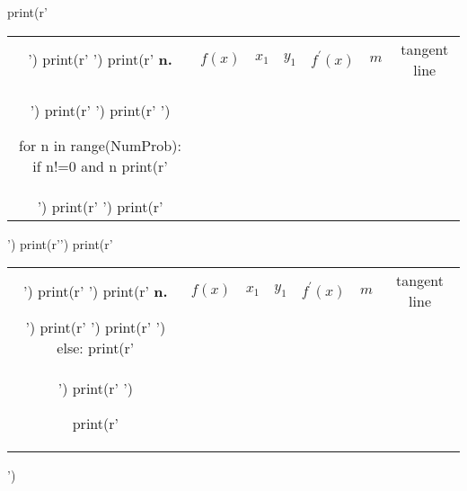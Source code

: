 \documentclass[ebook,12pt,oneside,openany]{memoir} %
\begin{document}
\begin{sympycode}


print(r' \begin{tabular}{|C{\OutColWidthSml}|C{\OutColWidthMed}|C{\OutColWidthSml}|C{\OutColWidthSml}|C{\OutColWidthMed}|C{\OutColWidthSml}|C{\OutColWidthBig}|} ')
print(r' \hline ')
print(r'    \textbf{n.}    &     $f(x)$      &    $x_1$       &     $y_1$       &     $f^{\prime}(x)$     &     $m$     &   \vphantom{\resizebox{!}{\ColHeight}{$|$}}   tangent line \vphantom{\resizebox{!}{\ColHeight}{$|$}}   \\ ')
print(r' \hline ')
print(r' \hline ')

for n in range(NumProb):
	if n!=0 and n %
		print(r' &  &  &  &  &  & \vphantom{\resizebox{!}{\ColHeight}{$|$}}  \vphantom{\resizebox{!}{\ColHeight}{$|$}} \\ ')
		print(r' \hline ')
		print(r'\end{tabular} ')
		print(r'\newpage ')
		print(r' \begin{tabular}{|C{\OutColWidthSml}|C{\OutColWidthMed}|C{\OutColWidthSml}|C{\OutColWidthSml}|C{\OutColWidthMed}|C{\OutColWidthSml}|C{\OutColWidthBig}|} ')
		print(r' \hline ')
		print(r'    \textbf{n.}    &     $f(x)$      &    $x_1$       &    $y_1$       &     $f^{\prime}(x)$     &     $m$     &  \vphantom{\resizebox{!}{\ColHeight}{$|$}}  tangent line  \vphantom{\resizebox{!}{\ColHeight}{$|$}}  \\ ')
		print(r' \hline ')
		print(r' \hline ')
	else:
		print(r' &    &  &   &   &   & \vphantom{\resizebox{!}{\ColHeight}{$|$}}  \vphantom{\resizebox{!}{\ColHeight}{$|$}} \\ ')
		print(r' \hline ')

print(r'\end{tabular} ')

\end{sympycode}



\end{document}
